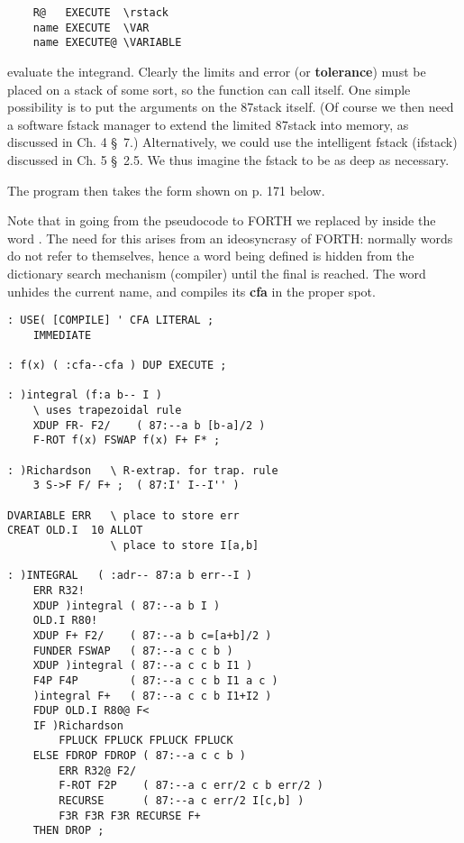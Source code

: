 \begin{lstlisting}
    R@   EXECUTE  \rstack
    name EXECUTE  \VAR
    name EXECUTE@ \VARIABLE
\end{lstlisting}

evaluate the integrand. Clearly the limits and error (or \textbf{tolerance}) must be placed on a stack of some sort, so the function can call itself. One simple possibility is to put the arguments on the 87stack itself. (Of course we then need a software fstack manager to extend the limited 87stack into memory, as discussed in Ch. 4 \S\ 7.) Alternatively, we could use the intelligent fstack (ifstack) discussed in Ch. 5 \S\ 2.5. We thus imagine the fstack to be as deep as necessary.

The program then takes the form shown on p. 171 below.

Note that in going from the pseudocode to FORTH we replaced  by  inside the word . The need for this arises from an ideosyncrasy of FORTH: normally words do not refer to themselves, hence a word being defined is hidden from the dictionary search mechanism (compiler) until the final \bc{;} is reached. The word  unhides the current name, and compiles its \textbf{cfa} in the proper spot.

\begin{multicols}{2}
    \tiny
    \begin{lstlisting}
: USE( [COMPILE] ' CFA LITERAL ;
    IMMEDIATE

: f(x) ( :cfa--cfa ) DUP EXECUTE ;

: )integral (f:a b-- I )
    \ uses trapezoidal rule
    XDUP FR- F2/    ( 87:--a b [b-a]/2 )
    F-ROT f(x) FSWAP f(x) F+ F* ;

: )Richardson   \ R-extrap. for trap. rule
    3 S->F F/ F+ ;  ( 87:I' I--I'' )

DVARIABLE ERR   \ place to store err
CREAT OLD.I  10 ALLOT
                \ place to store I[a,b]

: )INTEGRAL   ( :adr-- 87:a b err--I )
    ERR R32!
    XDUP )integral ( 87:--a b I )
    OLD.I R80!
    XDUP F+ F2/    ( 87:--a b c=[a+b]/2 )
    FUNDER FSWAP   ( 87:--a c c b )
    XDUP )integral ( 87:--a c c b I1 )
    F4P F4P        ( 87:--a c c b I1 a c )
    )integral F+   ( 87:--a c c b I1+I2 )
    FDUP OLD.I R80@ F<
    IF )Richardson
        FPLUCK FPLUCK FPLUCK FPLUCK
    ELSE FDROP FDROP ( 87:--a c c b )
        ERR R32@ F2/
        F-ROT F2P    ( 87:--a c err/2 c b err/2 )
        RECURSE      ( 87:--a c err/2 I[c,b] )
        F3R F3R F3R RECURSE F+
    THEN DROP ;
    \end{lstlisting}
\end{multicols}


